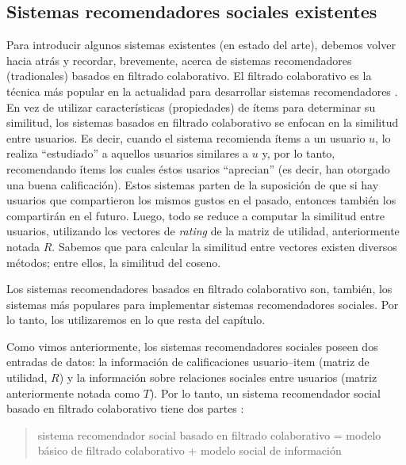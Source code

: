 	\subsection{Sistemas recomendadores sociales existentes}
		
		Para introducir algunos sistemas existentes (en estado del arte), debemos volver hacia atrás y recordar, brevemente, acerca de sistemas recomendadores (tradionales) basados en filtrado colaborativo. El filtrado colaborativo es la técnica más popular en la actualidad para desarrollar sistemas recomendadores \cite{ullman2014}. En vez de utilizar características (propiedades) de ítems para determinar su similitud, los sistemas basados en filtrado colaborativo se enfocan en la similitud entre usuarios. Es decir, cuando el sistema recomienda ítems a un usuario $u$, lo realiza \enquote{estudiado} a aquellos usuarios similares a $u$ y, por lo tanto, recomendando ítems los cuales éstos usarios \enquote{aprecian} (es decir, han otorgado una buena calificación). Estos sistemas parten de la suposición de que si hay usuarios que compartieron los mismos gustos en el pasado, entonces también los compartirán en el futuro. Luego, todo se reduce a computar la similitud entre usuarios, utilizando los vectores de \textit{rating} de la matriz de utilidad, anteriormente notada $R$. Sabemos que para calcular la similitud entre vectores existen diversos métodos; entre ellos, la similitud del coseno. \par
		
		Los sistemas recomendadores basados en filtrado colaborativo son, también, los sistemas más populares para implementar sistemas recomendadores sociales. Por lo tanto, los utilizaremos en lo que resta del capítulo. \par
		
		Como vimos anteriormente, los sistemas recomendadores sociales poseen dos entradas de datos: la información de calificaciones usuario--item (matriz de utilidad, $R$) y la información sobre relaciones sociales entre usuarios (matriz anteriormente notada como $T$). Por lo tanto, un sistema recomendador social basado en filtrado colaborativo tiene dos partes \cite{tang2013}:
		\begin{quote}
			sistema recomendador social basado en filtrado colaborativo = modelo básico de filtrado colaborativo + modelo social de información
		\end{quote}
		
